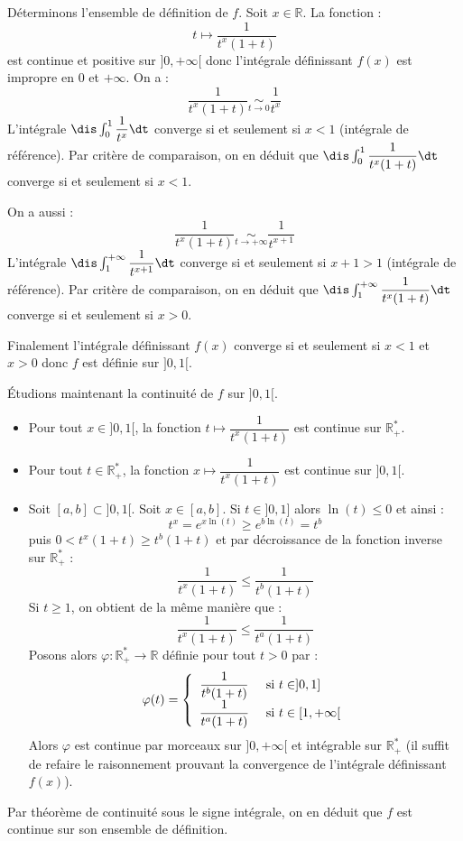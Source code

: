 \documentclass[a4paper,10pt]{report}
\begin{document}
\corr Déterminons l'ensemble de définition de $f$. Soit $x \in \mathbb{R}$. La fonction :
$$ t \mapsto  \dfrac{1}{t^x(1+t)}$$
est continue  et positive sur $]0, + \infty[$ donc l'intégrale définissant $f(x)$ est impropre en $0$ et $+ \infty$. On a :
$$  \dfrac{1}{t^x(1+t)} \underset{t \rightarrow 0}{\sim} \dfrac{1}{t^x}$$
L'intégrale $\dis \int_{0}^1 \dfrac{1}{t^x} \dt$ converge si et seulement si $x<1$ (intégrale de référence). Par critère de comparaison, on en déduit que $\dis \int_{0}^1 \dfrac{1}{t^x(1+t)} \dt$ converge si et seulement si $x<1$.

\medskip

\noindent On a aussi :
$$   \dfrac{1}{t^x(1+t)} \underset{t \rightarrow + \infty}{\sim} \dfrac{1}{t^{x+1}}$$
L'intégrale $\dis \int_{1}^{+ \infty} \dfrac{1}{t^{x+1}} \dt$ converge si et seulement si $x+1>1$ (intégrale de référence). Par critère de comparaison, on en déduit que $\dis \int_{1}^{+ \infty} \dfrac{1}{t^x(1+t)} \dt$ converge si et seulement si $x>0$.

\medskip

\noindent Finalement l'intégrale définissant $f(x)$ converge si et seulement si $x<1$ et $x>0$ donc $f$ est définie sur $]0,1[$.

\medskip

\noindent Étudions maintenant la continuité de $f$ sur $]0,1[$.
\begin{itemize}
\item Pour tout $x \in ]0,1[$, la fonction $t \mapsto \dfrac{1}{t^x(1+t)}$ est continue sur $\mathbb{R}_+^{*}$.
\item Pour tout $t \in \mathbb{R}_+^{*}$, la fonction $x \mapsto  \dfrac{1}{t^x(1+t)}$ est continue sur $]0,1[$.
\item Soit $[a,b] \subset ]0,1[$. Soit $x \in [a,b]$. Si $t \in ]0,1]$ alors $\ln(t) \leq 0$ et ainsi :
$$ t^x = e^{x \ln(t)} \geq e^{b \ln(t)} = t^b$$
puis $0<t^x(1+t) \geq t^b (1+t)$ et par décroissance de la fonction inverse sur $\mathbb{R}_+^{*}$ :
$$ \dfrac{1}{t^x(1+t)} \leq \dfrac{1}{t^b(1+t)}$$
Si $t \geq 1$, on obtient de la même manière que :
$$  \dfrac{1}{t^x(1+t)} \leq \dfrac{1}{t^a(1+t)}$$
Posons alors $\varphi : \mathbb{R}_+^{*} \rightarrow \mathbb{R}$ définie pour tout $t>0$ par :
$$ \varphi(t) = \left\lbrace  \begin{array}{cl}
\dfrac{1}{t^b(1+t)} & \hbox{ si } t \in ]0,1] \\
\dfrac{1}{t^a(1+t)} & \hbox{ si } t \in [1, + \infty[ 
\end{array}\right.$$
Alors $\varphi$ est continue par morceaux sur $]0, + \infty[$ et intégrable sur $\mathbb{R}_+^{*}$ (il suffit de refaire le raisonnement prouvant la convergence de l'intégrale définissant $f(x)$).
\end{itemize}
Par théorème de continuité sous le signe intégrale, on en déduit que $f$ est continue sur son ensemble de définition.
\end{document}
